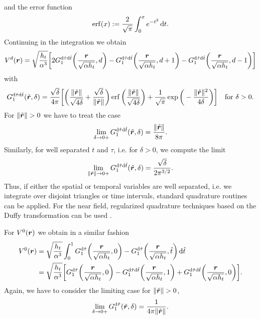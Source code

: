 \documentclass[a4paper,11pt]{article}
\begin{document}
and the error function
\begin{equation*}
  \operatorname{erf}(x) := \frac{2}{\sqrt{\pi}} \int_0^x e^{-t^2} \,{\mathrm{d}} t.
\end{equation*}
Continuing in the integration we obtain
\begin{equation*}
  V^d({{\bm{r}}}) = \sqrt{\frac{h_t}{\alpha^3}} \bigg[ 2G^{{\mathrm{d}}\hat\tau{\mathrm{d}}\hat t}_1\bigg(\frac{{{\bm{r}}}}{\sqrt{\alpha h_t}},d\bigg) - G^{{\mathrm{d}}\hat\tau{\mathrm{d}}\hat t}_1\bigg(\frac{{{\bm{r}}}}{\sqrt{\alpha h_t}},d+1\bigg) - G^{{\mathrm{d}}\hat\tau{\mathrm{d}}\hat t}_1\bigg(\frac{{{\bm{r}}}}{\sqrt{\alpha h_t}},d-1\bigg) \bigg]
\end{equation*}
with 
\begin{equation*}
  G^{{\mathrm{d}}\hat\tau{\mathrm{d}}\hat t}_1(\tilde{{{\bm{r}}}},\delta) = \frac{\sqrt{\delta}}{4\pi} \bigg[ \bigg( \frac{\|\tilde {{{\bm{r}}}}\|}{\sqrt{4\delta}} + \frac{\sqrt{\delta}}{\|\tilde {{{\bm{r}}}}\|} \bigg) \operatorname{erf}\bigg( \frac{\|\tilde {{{\bm{r}}}}\|}{\sqrt{4\delta}} \bigg) + \frac{1}{\sqrt{\pi}}\exp\bigg( -\frac{\|\tilde {{{\bm{r}}}}\|^2}{4\delta} \bigg) \bigg] \quad\text{for } \delta > 0.
\end{equation*}
For $\|\tilde {{{\bm{r}}}}\| > 0$ we have to treat the case
\begin{equation*}
  \lim_{\delta \to 0+} G^{{\mathrm{d}}\hat\tau{\mathrm{d}}\hat t}_1(\tilde{{{\bm{r}}}},\delta) = \frac{\|\tilde {{{\bm{r}}}}\|}{8\pi}.
\end{equation*} 
Similarly, for well separated $t$ and $\tau$, i.e. for $\delta > 0$, we compute the limit
\begin{equation*}
  \lim_{\|\tilde{{{\bm{r}}}}\|\to 0+} G^{{\mathrm{d}}\hat\tau{\mathrm{d}}\hat t}_1(\tilde{{{\bm{r}}}},\delta) = \frac{\sqrt{\delta}}{2\pi^{3/2}}.
\end{equation*}
Thus, if either the spatial or temporal variables are well separated, i.e. we integrate over disjoint triangles or time intervals, standard quadrature routines can be applied. For the near field, regularized quadrature techniques based on the Duffy transformation can be used \cite{SauSch2010,ManTau2019}. 

For $V^0({{\bm{r}}})$ we obtain in a similar fashion
\begin{align*}
  V^0({{\bm{r}}}) &= \sqrt{\frac{h_t}{\alpha^3}} \int_{0}^{1} G^{{\mathrm{d}}\hat \tau}_1\bigg(\frac{{{\bm{r}}}}{\sqrt{\alpha h_t}},0\bigg) - G^{{\mathrm{d}}\hat \tau}_1\bigg(\frac{{{\bm{r}}}}{\sqrt{\alpha h_t}},\hat t\bigg) \,{\mathrm{d}}\hat t \\
  &= \sqrt{\frac{h_t}{\alpha^3}} \bigg[ G^{{\mathrm{d}}\hat \tau}_1\bigg(\frac{{{\bm{r}}}}{\sqrt{\alpha h_t}},0\bigg) - G^{{\mathrm{d}}\hat\tau{\mathrm{d}}\hat t}_1\bigg(\frac{{{\bm{r}}}}{\sqrt{\alpha h_t}},1\bigg) + G^{{\mathrm{d}}\hat\tau{\mathrm{d}}\hat t}_1\bigg(\frac{{{\bm{r}}}}{\sqrt{\alpha h_t}},0\bigg) \bigg].
\end{align*}
Again, we have to consider the limiting case for $\|\tilde {{{\bm{r}}}}\| > 0$,
\begin{equation}
  \label{eq:G_dtau_lim_d}
  \lim_{\delta \to 0+} G^{{\mathrm{d}}\hat \tau}_1(\tilde {{{\bm{r}}}},\delta) = \frac{1}{4\pi\|\tilde {{{\bm{r}}}}\|}.
\end{equation}
\end{document}
